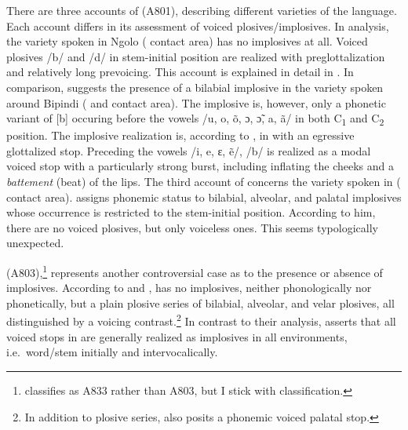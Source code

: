 \documentclass[output=paper]{LSP/langsci}
\begin{document}
There are three accounts of  (A801), describing different varieties of the language. Each account differs in its assessment of voiced plosives/implosives. In  analysis,  the  variety spoken in Ngolo ( contact area) has no implosives at all. Voiced plosives /b/ and /d/ in stem-initial position are realized with preglottalization and relatively long prevoicing. This account is explained in detail in . In comparison, \citet[49]{Renaud1976} suggests the presence of a bilabial implosive in the  variety spoken around Bipindi ( and  contact area). The implosive is, however, only a phonetic variant of [b] occuring before the vowels /u, o, õ, ɔ, ɔ̃, a, ã/ in both C\textsubscript{1} and C\textsubscript{2} position. The implosive realization is, according to \citet{Renaud1976}, in  with an egressive glottalized stop. Preceding the vowels /i, e, ɛ, ẽ/, /b/ is realized as a modal voiced stop with a particularly strong burst, including inflating the cheeks and a {\it battement}  (beat) of the lips.  The third account of  concerns the variety spoken in  ( contact area). \citet[3]{NgueUm2012} assigns phonemic status to bilabial, alveolar, and palatal implosives whose occurrence is restricted to the stem-initial position. According to him, there are no voiced plosives, but only voiceless ones. This seems typologically unexpected.

 (A803),\footnote{\citet[51]{Ollomo2013} classifies  as A833 rather than A803, but I stick with  classification.} represents another controversial case as to the presence or absence of implosives. According to \citet{Ollomo2013} and \citet{Puech1989},   has no implosives, neither phonologically nor phonetically, but a plain plosive series of bilabial, alveolar, and velar plosives, all distinguished by a voicing contrast.\footnote{In addition to  plosive series, \citet{Puech1989} also posits a phonemic voiced palatal stop.} In contrast to their analysis, \citet[56]{Dougere2007} asserts that all voiced stops in  are generally realized as implosives in all environments, i.e.\ word/stem initially and intervocalically.
\end{document}
